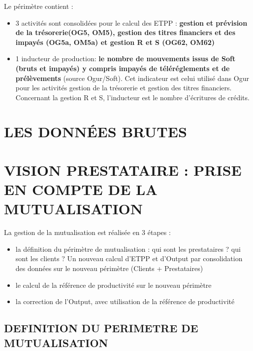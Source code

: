 \documentclass[
]{book}
\begin{document}
Le périmètre contient :

\begin{itemize}
\item
  3 activités sont consolidées pour le calcul des ETPP : \textbf{gestion et prévision de la trésorerie(OG5, OM5), gestion des titres financiers et des impayés (OG5a, OM5a) et gestion R et S (OG62, OM62)}
\item
  1 inducteur de production: \textbf{le nombre de mouvements issus de Soft (bruts et impayés) y compris impayés de téléréglements et de prélèvements} (source Ogur/Soft). Cet indicateur est celui utilisé dans Ogur pour les activités gestion de la trésorerie et gestion des titres financiers. Concernant la gestion R et S, l'inducteur est le nombre d'écritures de crédits.
\end{itemize}

\hypertarget{les-donnuxe9es-brutes}{%
\section{LES DONNÉES BRUTES}\label{les-donnuxe9es-brutes}}

\hypertarget{vision-prestataire-prise-en-compte-de-la-mutualisation}{%
\section{VISION PRESTATAIRE : PRISE EN COMPTE DE LA MUTUALISATION}\label{vision-prestataire-prise-en-compte-de-la-mutualisation}}

La gestion de la mutualisation est réalisée en 3 étapes :

\begin{itemize}
\item
  la définition du périmètre de mutualisation : qui sont les prestataires ? qui sont les clients ? Un nouveau calcul d'ETPP et d'Output par consolidation des données sur le nouveau périmètre (Clients + Prestataires)
\item
  le calcul de la référence de productivité sur le nouveau périmètre
\item
  la correction de l'Output, avec utilisation de la référence de productivité
\end{itemize}

\hypertarget{definition-du-perimetre-de-mutualisation}{%
\subsection{DEFINITION DU PERIMETRE DE MUTUALISATION}\label{definition-du-perimetre-de-mutualisation}}
\end{document}
